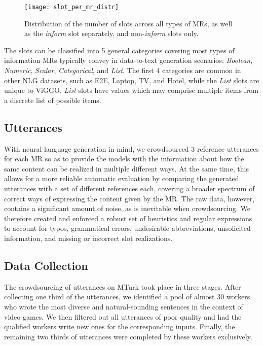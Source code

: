 \documentclass[11pt,a4paper]{article}
\begin{document}
\begin{figure}
    \begin{center}
        \texttt{[image: slot\_per\_mr\_distr]}
    \end{center}
    \vspace{-0.7cm}
    \caption{Distribution of the number of slots across all types of MRs, as well as the \emph{inform} slot separately, and non-\emph{inform} slots only.}
    \label{fig:slot_per_mr_distr}
    \vspace{-0.3cm}
\end{figure}

The slots can be classified into 5 general categories covering most types of information MRs typically convey in data-to-text generation scenarios:
\emph{Boolean}, \emph{Numeric}, \emph{Scalar}, \emph{Categorical}, and \emph{List}.
The first 4 categories are common in other NLG datasets, such as E2E, Laptop, TV, and Hotel, while the \emph{List} slots are unique to ViGGO. \emph{List} slots have values which may comprise multiple items from a discrete list of possible items.


\subsection{Utterances}

With neural language generation in mind, we crowdsourced 3 reference utterances for each MR so as to provide the models with the information about how the same content can be realized in multiple different ways. At the same time, this allows for a more reliable automatic evaluation by comparing the generated utterances with a set of different references each, covering a broader spectrum of correct ways of expressing the content given by the MR. The raw data, however, contains a significant amount of noise, as is inevitable when crowdsourcing. We therefore created and enforced a robust set of heuristics and regular expressions to account for typos, grammatical errors, undesirable abbreviations, unsolicited information, and missing or incorrect slot realizations.


\subsection{Data Collection}

The crowdsourcing of utterances on MTurk took place in three stages. After collecting one third of the utterances, we identified a pool of almost 30 workers who wrote the most diverse and natural-sounding sentences in the context of video games. We then filtered out all utterances of poor quality and had the qualified workers write new ones for the corresponding inputs. Finally, the remaining two thirds of utterances were completed by these workers exclusively.
\end{document}
